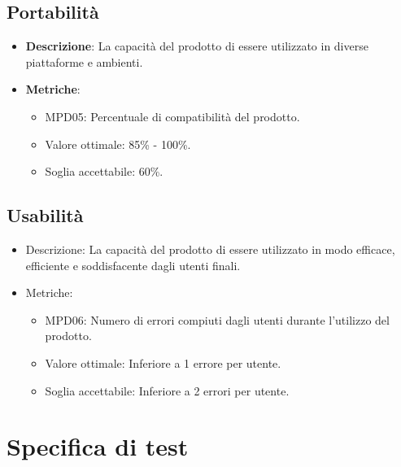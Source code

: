 \documentclass[12pt]{article}
\begin{document}
\subsection{Portabilità}
\begin{itemize}
	\item \textbf{Descrizione}: La capacità del prodotto di essere utilizzato in diverse piattaforme e ambienti.
	\item \textbf{Metriche}:
	      \begin{itemize}
		      \item MPD05: Percentuale di compatibilità del prodotto.
		      \item Valore ottimale: 85\% - 100\%.
		      \item Soglia accettabile: 60\%.
	      \end{itemize}
\end{itemize}

\subsection{Usabilità}
\begin{itemize}
	\item Descrizione: La capacità del prodotto di essere utilizzato in modo efficace, efficiente e soddisfacente dagli utenti finali.
	\item Metriche:
	      \begin{itemize}
		      \item MPD06: Numero di errori compiuti dagli utenti durante l'utilizzo del prodotto.
		      \item Valore ottimale: Inferiore a 1 errore per utente.
		      \item Soglia accettabile: Inferiore a 2 errori per utente.
	      \end{itemize}
\end{itemize}

\section{Specifica di test}
\end{document}
